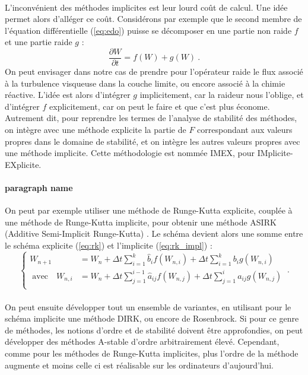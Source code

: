     \paragraph{}
    L’inconvénient des méthodes implicites est leur lourd coût de calcul.
    Une idée permet alors d'alléger ce coût.
    Considérons par exemple que le second membre de l'équation différentielle (\ref{eq:edo}) puisse se décomposer en une partie non raide $f$ et une partie raide $g$ :
    \[\frac{\partial W}{\partial t} = f\left(W\right) + g\left(W\right)\ .\]
    On peut envisager dans notre cas de prendre pour l'opérateur raide le flux associé à la turbulence visqueuse dans la couche limite, ou encore associé à la chimie réactive.
    L'idée est alors d'intégrer $g$ implicitement, car la raideur nous l'oblige, et d'intégrer $f$ explicitement, car on peut le faire et que c'est plus économe.
    Autrement dit, pour reprendre les termes de l'analyse de stabilité des méthodes, on intègre avec une méthode explicite la partie de $F$ correspondant aux valeurs propres dans le domaine de stabilité, et on intègre les autres valeurs propres avec une méthode implicite.
    Cette méthodologie est nommée IMEX, pour IMplicite-EXplicite.

    \paragraph{paragraph name}
    On peut par exemple utiliser une méthode de Runge-Kutta explicite, couplée à une méthode de Runge-Kutta implicite, pour obtenir une méthode ASIRK (Additive Semi-Implicit Runge-Kutta) \cite{Zhong1996}.
    Le schéma devient alors une somme entre le schéma explicite (\ref{eq:rk}) et l'implicite (\ref{eq:rk_impl}) :
    \[\left\{\begin{aligned}
      W_{n+1} &= W_n + \Delta t\sum_{i = 1}^k\hat{b}_if\left(W_{n,i}\right) + \Delta t\sum_{i = 1}^kb_ig\left(W_{n,i}\right)\\
      \;\textrm{avec}\quad W_{n,i} &= W_n + \Delta t\sum_{j = 1}^{i-1}\hat{a}_{ij}f\left(W_{n,j}\right) + \Delta t\sum_{j = 1}^{i}a_{ij}g\left(W_{n,j}\right) \\
    \end{aligned}\right.\ .\]

    \paragraph{}
    On peut ensuite développer tout un ensemble de variantes, en utilisant pour le schéma implicite une méthode DIRK, ou encore de Rosenbrock.
    Si pour ce genre de méthodes, les notions d'ordre et de stabilité doivent être approfondies, on peut développer des méthodes A-stable d'ordre arbitrairement élevé.
    Cependant, comme pour les méthodes de Runge-Kutta implicites, plus l'ordre de la méthode augmente et moins celle ci est réalisable sur les ordinateurs d'aujourd'hui.

